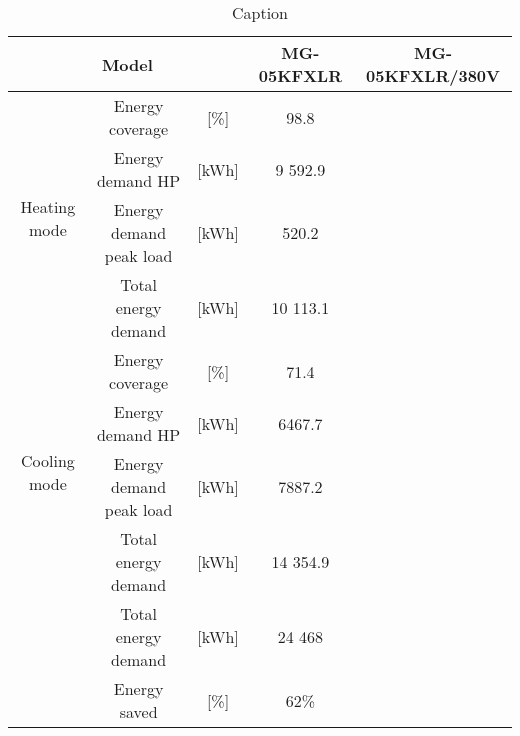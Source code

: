 \begin{table}[h!]
    \centering
        \caption{Caption}
    \begin{tabular}{|c|c|c|c|c|}
         \hline
         \multicolumn{3}{|c|}{Model} & MG-05KFXLR & MG-05KFXLR/380V \\
         \hline
       \multirow{4}{*}{Heating mode} & Energy coverage & [\%] & 98.8  & \\
         \cline{2-5}
         & Energy demand HP & [kWh] & 9 592.9  &  \\
         \cline{2-5}
         & Energy demand peak load & [kWh] & 520.2  & \\
        \cline{2-5}
         & Total energy demand & [kWh] & 10 113.1 &  \\
        \cline{1-5}
         \multirow{4}{*}{Cooling mode} & Energy coverage &[\%]  & 71.4 & \\
         \cline{2-5}
         & Energy demand HP & [kWh] & 6467.7 & \\
        \cline{2-5}
        & Energy demand peak load & [kWh] & 7887.2 & \\
        \cline{2-5}
         & Total energy demand & [kWh] & 14 354.9  &  \\
         \hline
         & Total energy demand & [kWh] & 24 468  &  \\
         \hline
         & Energy saved  & [\%] &  62\% &   \\
         \hline
    \end{tabular}
    \label{tab:hpchina}
\end{table}

